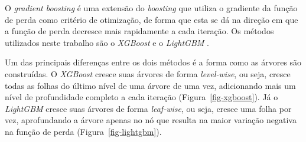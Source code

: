 \begin{apendicesenv}
O \emph{gradient boosting} é uma extensão do \emph{boosting} que utiliza
o gradiente da função de perda como critério de otimização, de forma que
esta se dá na direção em que a função de perda decresce mais rapidamente
a cada iteração. Os métodos utilizados neste trabalho são o
\emph{XGBoost} \autocite{chen_xgboost_2016} e o \emph{LightGBM}
\autocite{ke_lightgbm_2017}.

Um das principais diferenças entre os dois métodos é a forma como as
árvores são construídas. O \emph{XGBoost} cresce suas árvores de forma
\emph{level-wise}, ou seja, cresce todas as folhas do último nível de
uma árvore de uma vez, adicionando mais um nível de profundidade
completo a cada iteração (Figura~\ref{fig-xgboost}). Já o
\emph{LightGBM} cresce suas árvores de forma \emph{leaf-wise}, ou seja,
cresce uma folha por vez, aprofundando a árvore apenas no nó que resulta
na maior variação negativa na função de perda
(Figura~\ref{fig-lightgbm}).

\begin{figure}

  \begin{minipage}[t]{\linewidth}
    {\centering{}}
  \end{minipage}%
  \newline
  \begin{minipage}[t]{\linewidth}
    {\centering{}}
  \end{minipage}%


\end{figure}
\end{apendicesenv}

